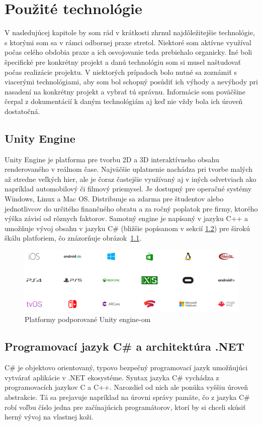 \documentclass[slovak, bachelorpractice]{diploma}
\begin{document}
\chapter{Použité technológie}
\label{sec:Tech}
V nasledujúcej kapitole by som rád v krátkosti zhrnul najdôležitejšie technológie, s ktorými som sa v rámci odbornej praxe stretol. Niektoré som aktívne využíval počas celého obdobia praxe a ich osvojovanie teda prebiehalo organicky. Iné boli špecifické pre konkrétny projekt a danú technológiu som si musel naštudovať počas realizácie projektu. V niektorých prípadoch bolo nutné sa zoznámiť s viacerými technológiami, aby som bol schopný posúdiť ich výhody a nevýhody pri nasadení na konkrétny projekt a vybrať tú správnu. Informácie som poväčšine čerpal z dokumentácií k daným technológiám aj keď nie vždy bola ich úroveň dostatočná.
\section{Unity Engine}
\label{sec:Unity}
Unity Engine \cite{Unity} je platforma pre tvorbu 2D a 3D interaktívneho obsahu renderovaného v reálnom čase. Najväčšie uplatnenie nachádza pri tvorbe malých až stredne veľkých hier, ale je čoraz častejšie využívaný aj v iných odvetviach ako napríklad automobilový či filmový priemysel. Je dostupný pre operačné systémy Windows, Linux a Mac OS. Distribuuje sa zdarma pre študentov alebo jednotlivcov do určitého finančného obratu a za ročný poplatok pre firmy, ktorého výška závisí od rôznych faktorov. Samotný engine je napísaný v jazyku C++ a umožňuje vývoj obsahu v jazyku C\# (bližšie popísanom v sekcií \ref{sec:CsharpDotNet}) pre širokú škálu platforiem, čo znázorňuje \mbox{obrázok \ref{pic:UnityPlatforms}}.

\begin{figure}[!htbp]
	\centering
	\includegraphics[width=1\textwidth]{Pictures/platforms.png}
	\caption{Platformy podporované Unity engine-om \cite{UnityMultiplatform}}
	\label{pic:UnityPlatforms}
\end{figure}

\section{Programovací jazyk C\# a architektúra .NET}
\label{sec:CsharpDotNet}
C\# \cite{CSharpLang} je objektovo orientovaný, typovo bezpečný programovací jazyk umožňujúci vytvárať aplikácie v .NET ekosystéme. Syntax jazyka C\# vychádza z programovacích jazykov C a C++. Narozdiel od nich ale ponúka vyššiu úroveň abstrakcie. Tá sa prejavuje napríklad na úrovni správy pamäte, čo z jazyka C\# robí voľbu číslo jedna pre začínajúcich programátorov, ktorí by si chceli skúsiť herný vývoj na vlastnej koži.
\end{document}
